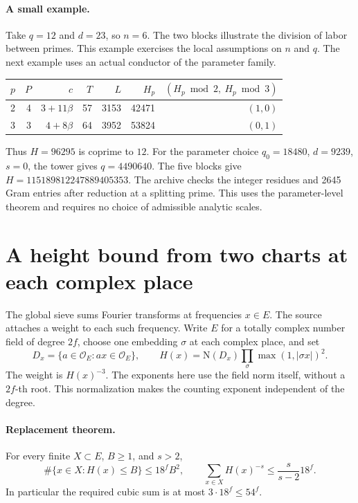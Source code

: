 \documentclass[11pt,letterpaper]{article}
\begin{document}
\paragraph{A small example.}
Take $q=12$ and $d=23$, so $n=6$. The two blocks illustrate the division of labor between primes. This example exercises the local assumptions on $n$ and $q$. The next example uses an actual conductor of the parameter family.
\begin{center}
\begin{tabular}{rrrrrrr}\toprule
$p$ & $P$ & $c$ & $T$ & $L$ & $H_p$ & $(H_p\bmod 2,\ H_p\bmod 3)$\\\midrule
2 & 4 & $3+11\beta$ & 57 & 3153 & 42471 & $(1,0)$\\
3 & 3 & $4+8\beta$ & 64 & 3952 & 53824 & $(0,1)$\\\bottomrule
\end{tabular}
\end{center}
Thus $H=96295$ is coprime to $12$. For the parameter choice $q_0=18480$, $d=9239$, $s=0$, the tower gives $q=4490640$. The five blocks give $H=115189812247889405353$. The archive checks the integer residues and 2645 Gram entries after reduction at a splitting prime. This uses the parameter-level theorem and requires no choice of admissible analytic scales.

\section{A height bound from two charts at each complex place}

The global sieve sums Fourier transforms at frequencies $x\in E$.
The source attaches a weight to each such frequency.  Write $E$ for a
totally complex number field of degree $2f$, choose one embedding $\sigma$
at each complex place, and set
\[
 D_x=\{a\in\mathcal O_E:ax\in\mathcal O_E\},\qquad
 H(x)=\mathrm N(D_x)\prod_\sigma\max(1,|\sigma x|)^2.
\]
The weight is $H(x)^{-3}$. The exponents here use the field norm itself,
without a $2f$-th root. This normalization makes the counting exponent
independent of the degree.

\paragraph{Replacement theorem.}
For every finite $X\subset E$, $B\ge1$, and $s>2$,
\[
 \#\{x\in X:H(x)\le B\}\le18^fB^2,\qquad
 \sum_{x\in X}H(x)^{-s}\le\frac{s}{s-2}18^f .
\]
In particular the required cubic sum is at most $3\cdot18^f\le54^f$.
\end{document}
